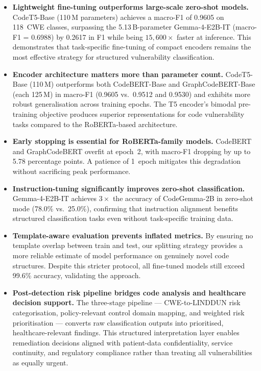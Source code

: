 \begin{itemize}
    \item \textbf{Lightweight fine-tuning outperforms large-scale
          zero-shot models.}  CodeT5-Base (110\,M parameters) achieves a
          macro-F1 of 0.9605 on 118~CWE classes, surpassing the
          5.13\,B-parameter Gemma-4-E2B-IT (macro-F1 = 0.6988) by 0.2617
          in F1 while being $15{,}600\times$ faster at inference.  This
          demonstrates that task-specific fine-tuning of compact encoders
          remains the most effective strategy for structured vulnerability
          classification.

    \item \textbf{Encoder architecture matters more than parameter count.}
          CodeT5-Base (110\,M) outperforms both CodeBERT-Base and
          GraphCodeBERT-Base (each 125\,M) in macro-F1 (0.9605 vs.\ 0.9512
          and 0.9530) and exhibits more robust generalisation across
          training epochs.  The T5 encoder's bimodal pre-training objective
          produces superior representations for code vulnerability tasks
          compared to the RoBERTa-based architecture.

    \item \textbf{Early stopping is essential for RoBERTa-family models.}
          CodeBERT and GraphCodeBERT overfit at epoch~2, with macro-F1
          dropping by up to 5.78 percentage points.  A patience of
          1~epoch mitigates this degradation without sacrificing peak
          performance.

    \item \textbf{Instruction-tuning significantly improves zero-shot
          classification.}  Gemma-4-E2B-IT achieves $3\times$ the accuracy
          of CodeGemma-2B in zero-shot mode (78.0\% vs.\ 25.0\%),
          confirming that instruction alignment benefits structured
          classification tasks even without task-specific training data.

    \item \textbf{Template-aware evaluation prevents inflated metrics.}
          By ensuring no template overlap between train and test, our
          splitting strategy provides a more reliable estimate of model
          performance on genuinely novel code structures.  Despite this
          stricter protocol, all fine-tuned models still exceed 99.6\%
          accuracy, validating the approach.

    \item \textbf{Post-detection risk pipeline bridges code analysis
          and healthcare decision support.}
          The three-stage pipeline --- CWE-to-LINDDUN risk categorisation,
          policy-relevant control domain mapping, and weighted risk
          prioritisation --- converts raw classification outputs into
          prioritised, healthcare-relevant findings.  This structured
          interpretation layer enables remediation decisions aligned with
          patient-data confidentiality, service continuity, and regulatory
          compliance rather than treating all vulnerabilities as equally
          urgent.
\end{itemize}


